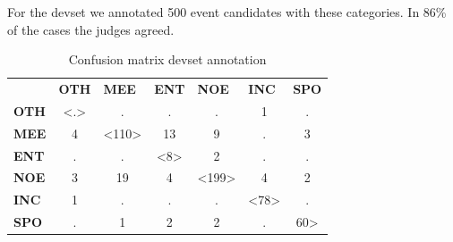 \documentclass[
10pt, %
a4paper, %
oneside, %
headinclude,footinclude, %
BCOR5mm, %
]{scrartcl}
\begin{document}
For the devset we annotated 500 event candidates with these categories. In 86\% of the cases the judges agreed.

\begin{table}[h]
\begin{tabular}{lcccccc}
                                  & \multicolumn{1}{l}{\textbf{OTH}}            & \multicolumn{1}{l}{\textbf{MEE}}              & \multicolumn{1}{l}{\textbf{ENT}}            & \multicolumn{1}{l}{\textbf{NOE}}              & \multicolumn{1}{l}{\textbf{INC}}             & \multicolumn{1}{l}{\textbf{SPO}}    \\ \cline{2-7} 
\multicolumn{1}{l|}{\textbf{OTH}} & \multicolumn{1}{c|}{\textless.\textgreater} & \multicolumn{1}{c|}{.}                        & \multicolumn{1}{c|}{.}                      & \multicolumn{1}{c|}{.}                        & \multicolumn{1}{c|}{1}                       & \multicolumn{1}{c|}{.}              \\ \cline{2-7} 
\multicolumn{1}{l|}{\textbf{MEE}} & \multicolumn{1}{c|}{4}                      & \multicolumn{1}{c|}{\textless110\textgreater} & \multicolumn{1}{c|}{13}                     & \multicolumn{1}{c|}{9}                        & \multicolumn{1}{c|}{.}                       & \multicolumn{1}{c|}{3}              \\ \cline{2-7} 
\multicolumn{1}{l|}{\textbf{ENT}} & \multicolumn{1}{c|}{.}                      & \multicolumn{1}{c|}{.}                        & \multicolumn{1}{c|}{\textless8\textgreater} & \multicolumn{1}{c|}{2}                        & \multicolumn{1}{c|}{.}                       & \multicolumn{1}{c|}{.}              \\ \cline{2-7} 
\multicolumn{1}{l|}{\textbf{NOE}} & \multicolumn{1}{c|}{3}                      & \multicolumn{1}{c|}{19}                       & \multicolumn{1}{c|}{4}                      & \multicolumn{1}{c|}{\textless199\textgreater} & \multicolumn{1}{c|}{4}                       & \multicolumn{1}{c|}{2}              \\ \cline{2-7} 
\multicolumn{1}{l|}{\textbf{INC}} & \multicolumn{1}{c|}{1}                      & \multicolumn{1}{c|}{.}                        & \multicolumn{1}{c|}{.}                      & \multicolumn{1}{c|}{.}                        & \multicolumn{1}{c|}{\textless78\textgreater} & \multicolumn{1}{c|}{.}              \\ \cline{2-7} 
\multicolumn{1}{l|}{\textbf{SPO}} & \multicolumn{1}{c|}{.}                      & \multicolumn{1}{c|}{1}                        & \multicolumn{1}{c|}{2}                      & \multicolumn{1}{c|}{2}                        & \multicolumn{1}{c|}{.}                       & \multicolumn{1}{c|}{60\textgreater} \\ \cline{2-7} 
\end{tabular}
\caption[Table caption text]{Confusion matrix devset annotation }
\end{table}
\end{document}

